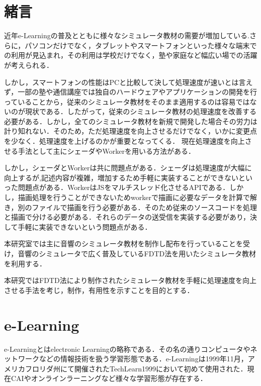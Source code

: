\documentclass[a4j,12pt]{jsarticle}
\begin{document}
\setcounter{page}{1} %
\setcounter{tocdepth}{3}
\tableofcontents
\clearpage
\listoffigures
\clearpage
\listoftables
\clearpage


\newpage
{}
\setcounter{page}{1} 
\section{緒言}
近年e-Learningの普及とともに様々なシミュレータ教材の需要が増加している.さらに，パソコンだけでなく，タブレットやスマートフォンといった様々な端末での利用が見込まれ，その利用は学校だけでなく，塾や家庭など幅広い場での活躍が考えられる．

しかし，スマートフォンの性能はPCと比較して決して処理速度が速いとは言えず，一部の塾や通信講座では独自のハードウェアやアプリケーションの開発を行っていることから，従来のシミュレータ教材をそのまま適用するのは容易ではないのが現状である．したがって，従来のシミュレータ教材の処理速度を改善する必要がある．しかし，全てのシミュレータ教材を新規で開発した場合その労力は計り知れない．そのため，ただ処理速度を向上させるだけでなく，いかに変更点を少なく．処理速度を上げるのかが重要となってくる．
現在処理速度を向上させる手法として主にシェーダやWorkerを用いる方法がある．

しかし，シェーダとWorkerは共に問題点がある．シェーダは処理速度が大幅に向上するが,記述内容が複雑，増加するため手軽に実装することができないといった問題点がある．WorkerはJSをマルチスレッド化させるAPIである．しかし，描画処理を行うことができないためworkerで描画に必要なデータを計算で解き，別のファイルで描画を行う必要がある．そのため従来のソースコードを処理と描画で分ける必要がある．それらのデータの送受信を実装する必要があり，決して手軽に実装できないという問題点がある．

本研究室では主に音響のシミュレータ教材を制作し配布を行っていることを受け，音響のシミュレータで広く普及しているFDTD法を用いたシミュレータ教材を利用する．


本研究ではFDTD法により制作されたシミュレータ教材を手軽に処理速度を向上させる手法を考じ，制作，有用性を示すことを目的とする．

\newpage
\section{e-Learning}
e-Learningとはelectronic Learningの略称である．その名の通りコンピュータやネットワークなどの情報技術を扱う学習形態である．e-Learningは1999年11月，アメリカフロリダ州にて開催されたTechLearn1999において初めて使用された．現在CAIやオンラインラーニングなど様々な学習形態が存在する． 
\end{document}
